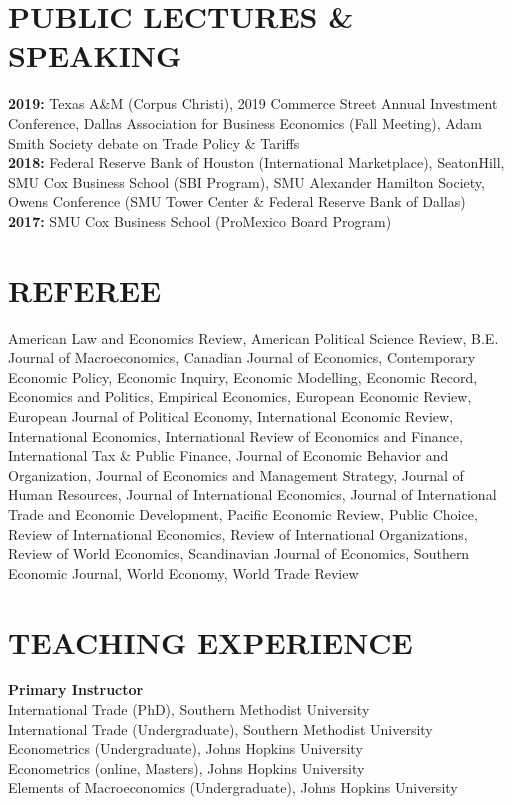 \documentclass[11pt]{res}
\begin{document}
\begin{resume}
\section{PUBLIC LECTURES \& SPEAKING}\vspace{1.5mm}
{\bf 2019:} Texas A\&M (Corpus Christi), 2019 Commerce Street Annual Investment Conference, Dallas Association for Business Economics (Fall Meeting), Adam Smith Society debate on Trade Policy \& Tariffs\vspace{1.5mm}\\
{\bf 2018:} Federal Reserve Bank of Houston (International Marketplace), SeatonHill, SMU Cox Business School (SBI Program), SMU Alexander Hamilton Society, Owens Conference (SMU Tower Center \& Federal Reserve Bank of Dallas)\vspace{1.5mm}\\
{\bf 2017:} SMU Cox Business School (ProMexico Board Program)

\section{REFEREE} \vspace{1.5mm}
American Law and Economics Review, American Political Science Review, B.E. Journal of Macroeconomics, Canadian Journal of Economics, Contemporary Economic Policy, Economic Inquiry, Economic Modelling, Economic Record, 
Economics and Politics, Empirical Economics, European Economic Review, European Journal of Political Economy, International Economic Review, International Economics, International Review of Economics and Finance, International Tax \& Public Finance, Journal of Economic Behavior and Organization, Journal of Economics and Management Strategy, Journal of Human Resources, Journal of International Economics, Journal of International Trade and Economic Development, Pacific Economic Review, Public Choice, Review of International Economics, Review of International Organizations, Review of World Economics, Scandinavian Journal of Economics, Southern Economic Journal, World Economy, World Trade Review

\section{TEACHING EXPERIENCE} \vspace{1.5mm}
{\bf Primary Instructor}\vspace{1.5mm}\\
International Trade (PhD), Southern Methodist University\vspace{1.5mm}\\
International Trade (Undergraduate), Southern Methodist University\vspace{1.5mm}\\
Econometrics (Undergraduate), Johns Hopkins University\vspace{1.5mm}\\
Econometrics (online, Masters), Johns Hopkins University\vspace{1.5mm}\\
Elements of Macroeconomics (Undergraduate), Johns Hopkins University

\end{resume}
\end{document}
